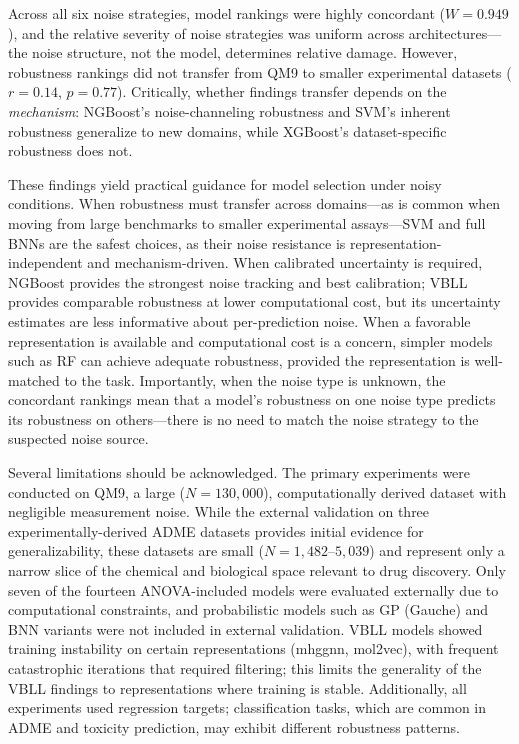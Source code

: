 \documentclass[pdflatex,sn-mathphys-num]{sn-jnl}%
\theoremstyle{thmstyleone}%
\theoremstyle{thmstyletwo}%
\theoremstyle{thmstylethree}%
\begin{document}
Across all six noise strategies, model rankings were highly concordant ($W = 0.949$), and the relative severity of noise strategies was uniform across architectures---the noise structure, not the model, determines relative damage. However, robustness rankings did not transfer from QM9 to smaller experimental datasets ($r = 0.14$, $p = 0.77$). Critically, whether findings transfer depends on the \emph{mechanism}: NGBoost's noise-channeling robustness and SVM's inherent robustness generalize to new domains, while XGBoost's dataset-specific robustness does not.

These findings yield practical guidance for model selection under noisy conditions. When robustness must transfer across domains---as is common when moving from large benchmarks to smaller experimental assays---SVM and full BNNs are the safest choices, as their noise resistance is representation-independent and mechanism-driven. When calibrated uncertainty is required, NGBoost provides the strongest noise tracking and best calibration; VBLL provides comparable robustness at lower computational cost, but its uncertainty estimates are less informative about per-prediction noise. When a favorable representation is available and computational cost is a concern, simpler models such as RF can achieve adequate robustness, provided the representation is well-matched to the task. Importantly, when the noise type is unknown, the concordant rankings mean that a model's robustness on one noise type predicts its robustness on others---there is no need to match the noise strategy to the suspected noise source.

Several limitations should be acknowledged. The primary experiments were conducted on QM9, a large ($N = 130{,}000$), computationally derived dataset with negligible measurement noise. While the external validation on three experimentally-derived ADME datasets provides initial evidence for generalizability, these datasets are small ($N = 1{,}482$--$5{,}039$) and represent only a narrow slice of the chemical and biological space relevant to drug discovery. Only seven of the fourteen ANOVA-included models were evaluated externally due to computational constraints, and probabilistic models such as GP (Gauche) and BNN variants were not included in external validation. VBLL models showed training instability on certain representations (mhggnn, mol2vec), with frequent catastrophic iterations that required filtering; this limits the generality of the VBLL findings to representations where training is stable. Additionally, all experiments used regression targets; classification tasks, which are common in ADME and toxicity prediction, may exhibit different robustness patterns.
\end{document}
